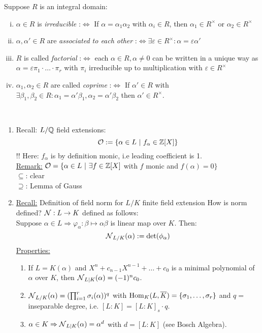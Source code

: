 \begin{remin}
Suppose $R$ is an integral domain:
\begin{enumerate}[i)]
\item $\alpha \in R$ is \emph{irreducible} :$\iff$ If $\alpha=\alpha_1 \alpha_2$ with $\alpha_i \in R$, then $\alpha_1 \in R^\times$ or $\alpha_2 \in R^\times$
\item $\alpha, \alpha' \in R$ are \emph{associated to each other} :$\iff \exists \varepsilon \in R^\times: \alpha = \varepsilon \alpha'$
\item $R$ is called \emph{factorial} :$\iff$ each $\alpha \in R, \alpha\neq 0$ can be written in a unique way as\\
$\alpha = \varepsilon \pi_1 \cdot \ldots \cdot \pi_r$ with $\pi_i$ irreducible up to multiplication with $\varepsilon \in R^\times$
\item $\alpha_1, \alpha_2 \in R$ are called \emph{coprime} :$\iff$ If $\alpha' \in R$ with $\exists \beta_1, \beta_2 \in R: \alpha_1=\alpha'\beta_1, \alpha_2=\alpha'\beta_2$ then $\alpha' \in R^\times$.
\end{enumerate}
\end{remin}

\begin{Bem*}\ \vspace*{-\baselineskip}
\begin{enumerate}
\item 
Recall: $L/\mathbb{Q}$ field extensions:
\[ \mathcal{O} :=\{\alpha \in L \ | \ f_\alpha \in \mathbb{Z}[X]\}\]
!! Here: $f_\alpha$ is by definition monic, i.e leading coefficient is 1.\\
\underline{Remark:} $\O=\{\alpha \in L \ | \ \exists f \in \Z[X]$ with $f$ monic and $f(\alpha)=0\}$\\
\glqq $\subseteq$\grqq: clear\\
\glqq $\supseteq$\grqq: Lemma of Gauss
\item \underline{Recall:} Definition of field norm for $L / K$ finite field extension
How is norm defined? $\operatorname{\mathcal{N}}: L \to K$ defined as follows:\\
Suppose $\alpha \in L \Rightarrow \varphi_\alpha: \beta \mapsto \alpha \beta$ is linear map over $K$. Then:
\[\operatorname{\mathcal{N}}_{L/K}(\alpha) := \det (\phi_\alpha)\]
\underline{Properties:}
\begin{enumerate}
\item If $L= K(\alpha)$ and $X^n+c_{n-1}X^{n-1}+\dots+c_0$ is a minimal polynomial of $\alpha$ over $K$, then $\operatorname{\mathcal{N}}_{L|K}(\alpha) = (-1)^n c_0$.\\
\item $\operatorname{\mathcal{N}}_{L/K}(\alpha)=(\prod_{i=1}^r \sigma_i(\alpha))^q$ with $\operatorname{Hom}_K(L, \overline K)= \{\sigma_1, \dots, \sigma_r\}$ and $q=$ inseparable degree, i.e. $[L:K]=[L:K]_s \cdot q$.
\item $\alpha \in K \Rightarrow \operatorname{\mathcal{N}}_{L|K}(\alpha)=\alpha^d$ with $d = [L:K]$ (see Bosch \glqq Algebra).
\end{enumerate}
\end{enumerate}
\end{Bem*}

